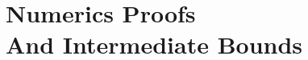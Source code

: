 \section[Numerics Proofs And Bounds]{Numerics Proofs\\And Intermediate Bounds}\label{app:numerics-proofs}
